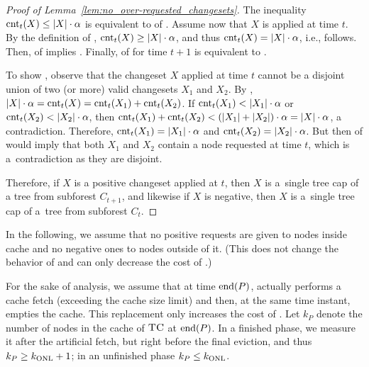 \begin{proof}[Proof of Lemma~\ref*{lem:no_over-requested_changesets}]
The inequality $\textrm{cnt}_t(X) \leq |X| \cdot \alpha$ is equivalent to
 of .
Assume now that $X$ is applied at time $t$. By the definition of \ALGTC,
$\textrm{cnt}_t(X) \geq |X| \cdot \alpha$, and thus $\textrm{cnt}_t(X) = |X| \cdot \alpha$,
i.e.,  follows. Then, 
of  implies .
Finally,  of
 for time $t+1$ is equivalent to
.

To show , observe that the changeset $X$
applied at time $t$ cannot be a disjoint union of two (or more) valid
changesets $X_1$ and $X_2$. By , $|X| \cdot \alpha =
\textrm{cnt}_t(X) = \textrm{cnt}_t(X_1) + \textrm{cnt}_t(X_2)$. If $\textrm{cnt}_t(X_1) < |X_1| \cdot \alpha$
or $\textrm{cnt}_t(X_2) < |X_2| \cdot \alpha$, then $\textrm{cnt}_t(X_1) + \textrm{cnt}_t(X_2) <
(|X_1| + |X_2|) \cdot \alpha = |X| \cdot \alpha$, a contradiction. Therefore,
$\textrm{cnt}_t(X_1) = |X_1| \cdot \alpha$ and $\textrm{cnt}_t(X_2) = |X_2| \cdot
\alpha$. But then  of
 would imply that both $X_1$ and $X_2$
contain a node requested at time $t$, which is a~contradiction as they are
disjoint.

Therefore, if $X$ is a positive changeset applied at $t$, then $X$ is a~single
tree cap of a tree from subforest $C_{t+1}$, and likewise if $X$ is negative,
then $X$ is a~single tree cap of a~tree from subforest $C_t$.
\end{proof}

In the following, we assume that no positive requests are given to nodes
inside cache and no negative ones to nodes outside of it. (This does not
change the behavior of \ALGTC and can only decrease the cost of \OPT.)

For the sake of analysis, we assume that at time $\textrm{end}(P)$, \ALGTC actually
performs a cache fetch (exceeding the cache size limit) and then, at the same
time instant, empties the cache. This replacement only increases the cost of
\ALGTC. Let $k_P$ denote the number of nodes in the cache of $\textsc{TC}$ at $\textrm{end}(P)$.
In a finished phase, we measure it after the artificial fetch, but right
before the final eviction, and thus $k_P \geq k_\textnormal{ONL} + 1$; in an unfinished
phase $k_P \leq k_\textnormal{ONL}$.

